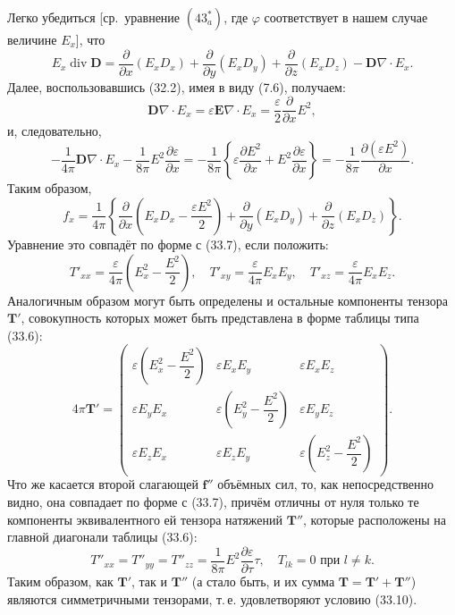 \documentclass[a4paper,12pt]{article}
\begin{document}
Легко убедиться [ср.\ уравнение $(43^*_a)$, где $\varphi$ соответствует
в нашем случае величине $E_x$], что
$$
    E_x\operatorname{div}\mathbf{D}
    = \frac{\partial}{\partial x}(E_x D_x)
    + \frac{\partial}{\partial y}(E_x D_y)
    + \frac{\partial}{\partial z}(E_x D_z)
    - \mathbf{D}\nabla\cdot E_x.
$$
Далее, воспользовавшись (32.2), имея в виду (7.6), получаем:
$$
    \mathbf{D}\nabla\cdot E_x = \varepsilon\mathbf{E}\nabla\cdot E_x
    = \frac{\varepsilon}{2}\frac{\partial}{\partial x}E^2,
$$
и, следовательно,
$$
    -\frac{1}{4\pi}\mathbf{D}\nabla\cdot E_x
    - \frac{1}{8\pi}E^2\frac{\partial\varepsilon}{\partial x}
    = -\frac{1}{8\pi}\left\{
        \varepsilon\frac{\partial E^2}{\partial x}
      + E^2\frac{\partial\varepsilon}{\partial x}
    \right\}
    = -\frac{1}{8\pi}\frac{\partial(\varepsilon E^2)}{\partial x}.
$$
Таким образом,
$$
    f_x = \frac{1}{4\pi}\left\{
        \frac{\partial}{\partial x}\!\left(E_x D_x - \frac{\varepsilon E^2}{2}\right)
      + \frac{\partial}{\partial y}(E_x D_y)
      + \frac{\partial}{\partial z}(E_x D_z)
    \right\}.
$$
Уравнение это совпадёт по форме с (33.7), если положить:
$$
    T'_{xx} = \frac{\varepsilon}{4\pi}\!\left(E_x^2 - \frac{E^2}{2}\right),
    \quad
    T'_{xy} = \frac{\varepsilon}{4\pi}E_x E_y,
    \quad
    T'_{xz} = \frac{\varepsilon}{4\pi}E_x E_z.
$$
Аналогичным образом могут быть определены и остальные компоненты
тензора $\mathbf{T}'$, совокупность которых может быть представлена
в форме таблицы типа (33.6):
\begin{equation}
    4\pi\mathbf{T}' =
    \begin{pmatrix}
        \varepsilon\!\left(E_x^2 - \dfrac{E^2}{2}\right)
            & \varepsilon E_x E_y & \varepsilon E_x E_z \\
        \varepsilon E_y E_x
            & \varepsilon\!\left(E_y^2 - \dfrac{E^2}{2}\right)
            & \varepsilon E_y E_z \\
        \varepsilon E_z E_x
            & \varepsilon E_z E_y
            & \varepsilon\!\left(E_z^2 - \dfrac{E^2}{2}\right)
    \end{pmatrix}.
    \tag{34.2}
\end{equation}
Что же касается второй слагающей $\mathbf{f}''$ объёмных сил, то, как
непосредственно видно, она совпадает по форме с (33.7), причём отличны
от нуля только те компоненты эквивалентного ей тензора натяжений
$\mathbf{T}''$, которые расположены на главной диагонали таблицы (33.6):
\begin{equation}
    T''_{xx} = T''_{yy} = T''_{zz}
    = \frac{1}{8\pi}E^2\frac{\partial\varepsilon}{\partial\tau}\tau,
    \quad
    T_{lk} = 0 \text{ при } l \neq k.
    \tag{34.3}
\end{equation}
Таким образом, как $\mathbf{T}'$, так и $\mathbf{T}''$ (а стало быть,
и их сумма $\mathbf{T} = \mathbf{T}' + \mathbf{T}''$) являются
симметричными тензорами, т.\,е. удовлетворяют условию (33.10).
\end{document}

